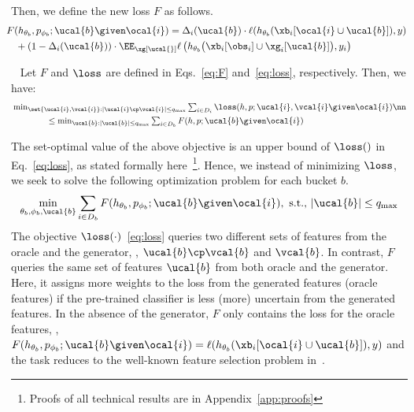 \documentclass[letterpaper]{article}
\renewcommand{\cite}{\citep}
\begin{document}
Then, we  define the new loss $F$ as follows.
\begin{align}
& \hspace{-2mm}F(h_{\theta_b},p_{\phi_b};\ucal{b} \given \ocal{i})  =
 \Delta_i(\ucal{b})  \cdot \ell(h_{\theta_b}(\xb_i[\ocal{i} \cup \ucal{b}]), y )   \nonumber \\
& \  + (1-\Delta_i(\ucal{b}) ) \cdot \EE_{\xg[\ucal{}] }   \ell\left(h_{\theta_b}\big(\xb_i [\obs_i ] \cup \xg_i [\ucal{b}]\big), y_i\right)
\label{eq:F}
\end{align}

\begin{proposition}~\label{prop:0}
Let $F$ and $\loss$ are defined in Eqs.~\ref{eq:F} and~\eqref{eq:loss}, respectively. Then, we have:
\begin{align}
&\textstyle\min_{\set{\ucal{i}, \vcal{i}}: |\ucal{i}\cp\vcal{i}| \le q_{\max}} \sum_{i\in D_i}\loss(h,p; \ucal{i}, \vcal{i}\given \ocal{i} ) \nn\\
& \qquad \qquad \le \textstyle \min_{\ucal{b}: |\ucal{b}| \le q_{\max}}\sum_{i\in D_b}F(h,p; \ucal{b} \given \ocal{i} )
\end{align}
\end{proposition}

The set-optimal value of the above objective is an upper bound of  $\loss ()$  in Eq.~\eqref{eq:loss}, as stated formally here~\footnote{\scriptsize Proofs of all technical results are  in Appendix~\ref{app:proofs}}.
Hence, we instead of minimizing $\loss$,
 we seek to solve the following optimization problem for each bucket $b$.
\begin{align}
\min_{\theta_b,\phi_b, \ucal{b} } \sum_{i\in D_b}F(h_{\theta_b},p_{\phi_b};\ucal{b} \given \ocal{i}), \ \text{s.t., } |\ucal{b}| \le q_{\max} \label{eq:objxx}
\end{align}
The objective $\loss(\cdot)$~\eqref{eq:loss} queries two different sets of features from the oracle and the generator, \ie, $\ucal{b}\cp\vcal{b}$ and $\vcal{b}$. In contrast, $F$ queries the same set of features $\ucal{b}$ from both oracle and the generator.  Here, it assigns more weights to the loss from the generated features (oracle features) if the pre-trained classifier is less (more) uncertain from the generated features. In the absence of the generator, $F$ only contains the loss for the oracle features, \ie, $F(h_{\theta_b},p_{\phi_b};\ucal{b} \given \ocal{i})= \ell(h_{\theta_b} (\xb_i [\ocal{i} \cup \ucal{b}]),y)$ and the task reduces to the well-known feature selection problem in~\cite{elenberg2018restricted}.
\end{document}

